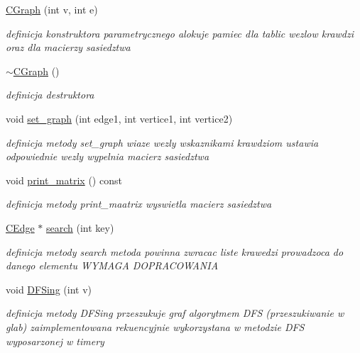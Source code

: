 \begin{DoxyCompactItemize}
\item 
\hyperlink{class_c_graph_a6568f9df5401061719c6b31111092df2}{C\+Graph} (int v, int e)
\begin{DoxyCompactList}\small\item\em definicja konstruktora parametrycznego alokuje pamiec dla tablic wezlow krawdzi oraz dla macierzy sasiedztwa \end{DoxyCompactList}\item 
\hyperlink{class_c_graph_af939e78d0fef6cea7711ae44f58f5a16}{$\sim$\+C\+Graph} ()
\begin{DoxyCompactList}\small\item\em definicja destruktora \end{DoxyCompactList}\item 
void \hyperlink{class_c_graph_a3633655888ffaa057bb4d3060c75a9db}{set\+\_\+graph} (int edge1, int vertice1, int vertice2)
\begin{DoxyCompactList}\small\item\em definicja metody set\+\_\+graph wiaze wezly wskaznikami krawdziom ustawia odpowiednie wezly wypelnia macierz sasiedztwa \end{DoxyCompactList}\item 
void \hyperlink{class_c_graph_a173a387b56acf5035e120f7ec4d144ae}{print\+\_\+matrix} () const 
\begin{DoxyCompactList}\small\item\em definicja metody print\+\_\+maatrix wyswietla macierz sasiedztwa \end{DoxyCompactList}\item 
\hyperlink{class_c_edge}{C\+Edge} $\ast$ \hyperlink{class_c_graph_a59a67b63e094ecab07a7abac9b32b209}{search} (int key)
\begin{DoxyCompactList}\small\item\em definicja metody search metoda powinna zwracac liste krawedzi prowadzoca do danego elementu W\+Y\+M\+A\+G\+A D\+O\+P\+R\+A\+C\+O\+W\+A\+N\+I\+A \end{DoxyCompactList}\item 
void \hyperlink{class_c_graph_aac7793993e150abc247a26ddd219a2e4}{D\+F\+Sing} (int v)
\begin{DoxyCompactList}\small\item\em definicja metody D\+F\+Sing przeszukuje graf algorytmem D\+F\+S (przeszukiwanie w glab) zaimplementowana rekuencyjnie wykorzystana w metodzie D\+F\+S wyposarzonej w timery \end{DoxyCompactList}\item 

\end{DoxyCompactItemize}
